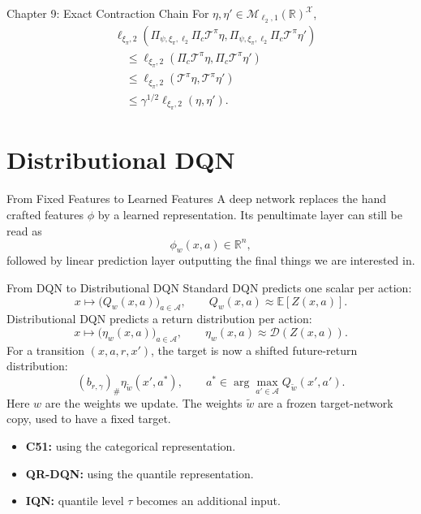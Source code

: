 \documentclass[10pt]{beamer}
\newcommand{\R}{\mathbb{R}}
\newcommand{\E}{\mathbb{E}}
\newcommand{\X}{\mathcal{X}}
\newcommand{\A}{\mathcal{A}}
\newcommand{\T}{\mathcal{T}}
\newcommand{\D}{\mathcal{D}}
\newcommand{\1}{\mathds{1}}
\begin{document}
\begin{frame}{Chapter 9: Exact Contraction Chain}
  For $\eta,\eta'\in\mathcal M_{\ell_2,1}(\R)^\X$,
  \[
  \begin{aligned}
    &\ell_{\xi_\pi,2}
    \left(
      \Pi_{\psi,\xi_\pi,\ell_2}\Pi_c\T^\pi\eta,
      \Pi_{\psi,\xi_\pi,\ell_2}\Pi_c\T^\pi\eta'
    \right) \\
    &\quad\leq
    \ell_{\xi_\pi,2}(\Pi_c\T^\pi\eta,\Pi_c\T^\pi\eta') \\
    &\quad\leq
    \ell_{\xi_\pi,2}(\T^\pi\eta,\T^\pi\eta') \\
    &\quad\leq
    \gamma^{1/2}\ell_{\xi_\pi,2}(\eta,\eta').
  \end{aligned}
  \]
\end{frame}

\section{Distributional DQN}

\begin{frame}{From Fixed Features to Learned Features}
  A deep network replaces the hand crafted features $\phi$ by a learned
  representation. Its penultimate layer can still be read as
  \[
    \phi_w(x, a)\in\R^n,
  \]
  followed by linear prediction layer outputting the final things we are interested in.
\end{frame}

\begin{frame}{From DQN to Distributional DQN}
  \small
  Standard DQN predicts one scalar per action:
  \[
    x\longmapsto \bigl(Q_w(x,a)\bigr)_{a\in\A},
    \qquad
    Q_w(x,a)\approx\E[Z(x,a)].
  \]
  Distributional DQN predicts a return distribution per action:
  \[
    x\longmapsto \bigl(\eta_w(x,a)\bigr)_{a\in\A},
    \qquad
    \eta_w(x,a)\approx \D(Z(x,a)).
  \]
  For a transition $(x,a,r,x')$, the target is now a shifted future-return
  distribution:
  \[
    (b_{r,\gamma})_\#\eta_{\widetilde w}(x',a^*),
    \qquad
    a^*\in\arg\max_{a'\in\A}Q_{\widetilde w}(x',a').
  \]
  \pause
  Here $w$ are the weights we update. The weights
  $\widetilde w$ are a frozen target-network copy, used to have a fixed target. \\

  \begin{itemize}
    \item \textbf{C51:} using the categorical representation.
    \item \textbf{QR-DQN:} using the quantile representation.
    \item \textbf{IQN:} quantile level $\tau$ becomes an additional input.
  \end{itemize}
\end{frame}
\end{document}
